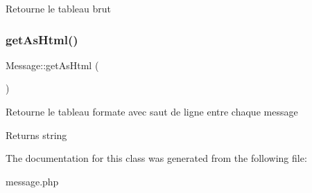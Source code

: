 Retourne le tableau brut \mbox{\label{classMessage_a09832b55a8b16c93af3a503f96d1c8d4}} 
\subsubsection{\texorpdfstring{get\+As\+Html()}{getAsHtml()}}
{\footnotesize\ttfamily Message\+::get\+As\+Html (\begin{DoxyParamCaption}{ }\end{DoxyParamCaption})}

Retourne le tableau formate avec saut de ligne entre chaque message

\begin{DoxyReturn}{Returns}
string 
\end{DoxyReturn}


The documentation for this class was generated from the following file\+:\begin{DoxyCompactItemize}
\item 
message.\+php\end{DoxyCompactItemize}
